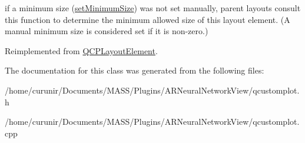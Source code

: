 if a minimum size (\hyperlink{class_q_c_p_layout_element_a5dd29a3c8bc88440c97c06b67be7886b}{set\+Minimum\+Size}) was not set manually, parent layouts consult this function to determine the minimum allowed size of this layout element. (A manual minimum size is considered set if it is non-\/zero.) 

Reimplemented from \hyperlink{class_q_c_p_layout_element_aebe14fb71f858c0f98caf8d342a9864a}{Q\+C\+P\+Layout\+Element}.



The documentation for this class was generated from the following files\+:\begin{DoxyCompactItemize}
\item 
/home/curunir/\+Documents/\+M\+A\+S\+S/\+Plugins/\+A\+R\+Neural\+Network\+View/qcustomplot.\+h\item 
/home/curunir/\+Documents/\+M\+A\+S\+S/\+Plugins/\+A\+R\+Neural\+Network\+View/qcustomplot.\+cpp\end{DoxyCompactItemize}
